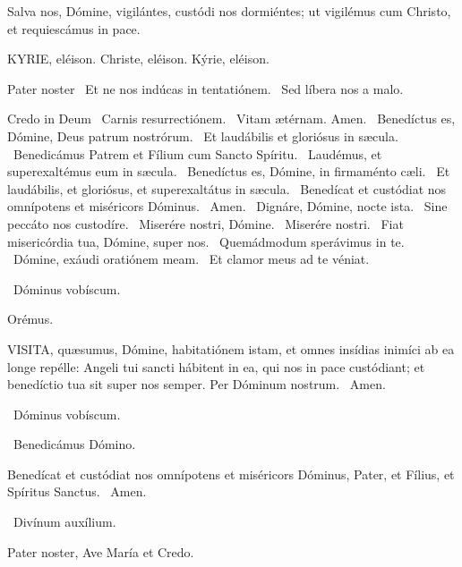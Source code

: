  Salva nos, Dómine, vigilántes, custódi nos dormiéntes; ut vigilémus cum Christo, et requiescámus in pace.


KYRIE, eléison. Christe, eléison. Kýrie, eléison.

Pater noster  \V\ Et ne nos indúcas in tentatiónem. \R\ Sed líbera nos a malo.

Credo in Deum  \V\ Carnis resurrectiónem. \R\ Vitam ætérnam. Amen. \V\ Benedíctus es, Dómine, Deus patrum nostrórum. \R\ Et laudábilis et gloriósus in sæcula. \V\ Benedicámus Patrem et Fílium cum Sancto Spíritu. \R\ Laudémus, et superexaltémus eum in sæcula. \V\ Benedíctus es, Dómine, in firmaménto cæli. \R\ Et laudábilis, et gloriósus, et superexaltátus in sæcula. \V\ Benedícat et custódiat nos omnípotens et miséricors Dóminus. \R\ Amen. \V\ Dignáre, Dómine, nocte ista. \R\ Sine peccáto nos custodíre. \V\ Miserére nostri, Dómine. \R\ Miserére nostri. \V\ Fiat misericórdia tua, Dómine, super nos. \R\ Quemádmodum sperávimus in te. \V\ Dómine, exáudi oratiónem meam. \R\ Et clamor meus ad te véniat.

\V\ Dóminus vobíscum.

Orémus. 

\lettrine[lines=2]{V}{ISITA}, quæsumus, Dómine, habitatiónem istam, et omnes insídias inimíci ab ea longe repélle: Angeli tui sancti hábitent in ea, qui nos in pace custódiant; et benedíctio tua sit super nos semper. Per Dóminum nostrum. \R\ Amen.

\V\ Dóminus vobíscum.

\V\ Benedicámus Dómino.

 Benedícat et custódiat nos omnípotens et miséricors Dóminus, Pater, et Fílius, et Spíritus Sanctus. \R\ Amen.


\V\ Divínum auxílium.

Pater noster, Ave María et Credo.

